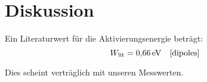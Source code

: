 \section{Diskussion}\label{sec:Diskussion}


Ein Literaturwert für die Aktivierungsenergie beträgt:
\begin{equation}
  W_\text{lit} = \SI{0.66}{\electronvolt} \quad \text{\cite{dipoles}}
\end{equation}

Dies scheint verträglich mit unseren Messwerten. 
